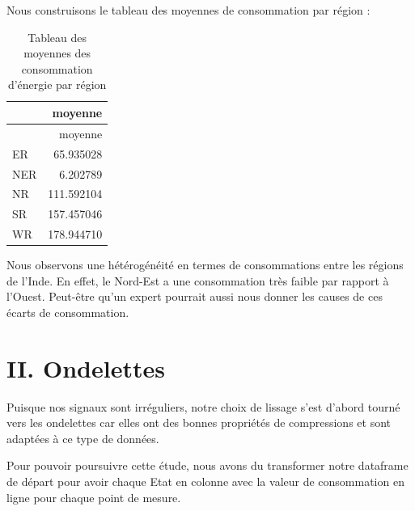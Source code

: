\documentclass[
]{article}
\newenvironment{Shaded}{\begin{snugshade}}{\end{snugshade}}
\newcommand{\AttributeTok}[1]{\textcolor[rgb]{0.77,0.63,0.00}{#1}}
\newcommand{\ConstantTok}[1]{\textcolor[rgb]{0.00,0.00,0.00}{#1}}
\newcommand{\FunctionTok}[1]{\textcolor[rgb]{0.00,0.00,0.00}{#1}}
\newcommand{\NormalTok}[1]{#1}
\newcommand{\SpecialCharTok}[1]{\textcolor[rgb]{0.00,0.00,0.00}{#1}}
\newcommand{\StringTok}[1]{\textcolor[rgb]{0.31,0.60,0.02}{#1}}
\begin{document}
Nous construisons le tableau des moyennes de consommation par région :

\begin{Shaded}
\end{Shaded}

\begin{longtable}[]{@{}lr@{}}
\caption{Tableau des moyennes des consommation d'énergie par
région}\tabularnewline
\toprule()
& moyenne \\
\midrule()
\endfirsthead
\toprule()
& moyenne \\
\midrule()
\endhead
ER & 65.935028 \\
NER & 6.202789 \\
NR & 111.592104 \\
SR & 157.457046 \\
WR & 178.944710 \\
\bottomrule()
\end{longtable}

Nous observons une hétérogénéité en termes de consommations entre les
régions de l'Inde. En effet, le Nord-Est a une consommation très faible
par rapport à l'Ouest. Peut-être qu'un expert pourrait aussi nous donner
les causes de ces écarts de consommation.

\hypertarget{ii.-ondelettes}{%
\section{II. Ondelettes}\label{ii.-ondelettes}}

Puisque nos signaux sont irréguliers, notre choix de lissage s'est
d'abord tourné vers les ondelettes car elles ont des bonnes propriétés
de compressions et sont adaptées à ce type de données.

Pour pouvoir poursuivre cette étude, nous avons du transformer notre
dataframe de départ pour avoir chaque Etat en colonne avec la valeur de
consommation en ligne pour chaque point de mesure.
\end{document}
